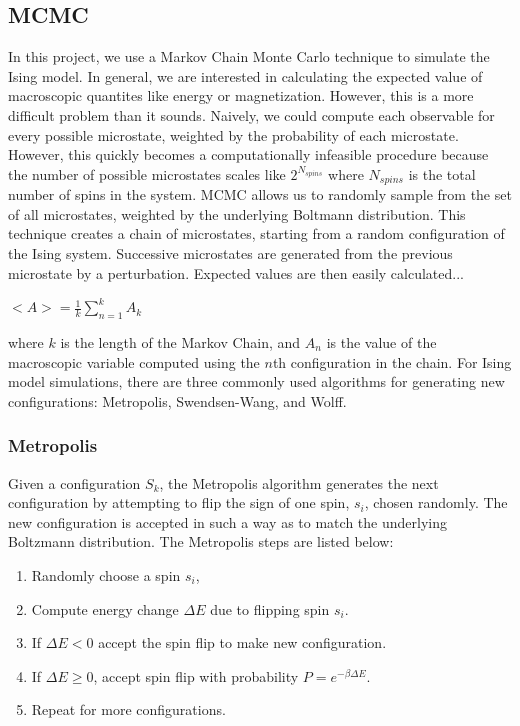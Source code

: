 \documentclass[a4paper]{article}
\begin{document}
\subsection{MCMC}
In this project, we use a Markov Chain Monte Carlo technique to simulate the Ising model. In general, we are interested in calculating the expected value of macroscopic quantites like energy or magnetization. However, this is a more difficult problem than it sounds. Naively, we could compute each observable for every possible microstate, weighted by the probability of each microstate. However, this quickly becomes a computationally infeasible procedure because the number of possible microstates scales like $2^{N_{spins}}$ where $N_{spins}$ is the total number of spins in the system. MCMC allows us to randomly sample from the set of all microstates, weighted by the underlying Boltmann distribution. This technique creates a chain of microstates, starting from a random configuration of the Ising system. Successive microstates are generated from the previous microstate by a perturbation. Expected values are then easily calculated...
\begin{center}
	$<A>=\frac{1}{k}\sum_{n=1}^{k}A_{k}$
\end{center}
where $k$ is the length of the Markov Chain, and $A_{n}$ is the value of the macroscopic variable computed using the $n$th configuration in the chain.
For Ising model simulations, there are three commonly used algorithms for generating new configurations: Metropolis, Swendsen-Wang, and Wolff.

\subsubsection{Metropolis}
Given a configuration $S_{k}$, the Metropolis algorithm generates the next configuration by attempting to flip the sign of one spin, $s_{i}$, chosen randomly. The new configuration is accepted in such a way as to match the underlying Boltzmann distribution. The Metropolis steps are listed below:
\begin{enumerate}
	\item Randomly choose a spin $s_{i}$,
	\item Compute energy change $\Delta E$ due to flipping spin $s_{i}$.
	\item If $\Delta E<0$ accept the spin flip to make new configuration.
	\item If $\Delta E\geq0$, accept spin flip with probability $P=e^{-\beta\Delta E}$.
	\item Repeat for more configurations.
\end{enumerate}
\end{document}
